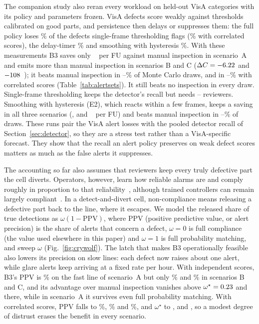 The companion study also reran every workload on \PaperAVisaCategories{} held-out VisA categories with its policy and parameters frozen. VisA defects score weakly against thresholds calibrated on good parts, and persistence then delays or suppresses them: the full policy loses \VisaRecallLossFull\% of the defects single-frame thresholding flags (\VisaCorrRecallLossFull\% with correlated scores), the delay-timer \VisaRecallLossTimer\% and smoothing with hysteresis \VisaRecallLossHyst\%. With these measurements B3 saves only \PrecVisaDeltaCvsLZero~\kgce{} per FU against manual inspection in scenario~A and emits more than manual inspection in scenarios B and C ($\Delta C=-6.22$ and $-108$~\kgce{}); it beats manual inspection in \VisaMcProbLMin--\VisaMcProbLMax\% of Monte Carlo draws, and in \VisaCorrMcProbLMin--\VisaCorrMcProbLMax\% with correlated scores (Table~\ref{tab:alertsets}). It still beats no inspection in every draw. Single-frame thresholding keeps the detector's recall but needs \VisaReviewersBZeroMin--\VisaReviewersBZeroMax{} reviewers. Smoothing with hysteresis (E2), which reacts within a few frames, keeps a saving in all three scenarios (\PrecVisaETwoDeltaC, \MetalVisaETwoDeltaC{} and \HiValVisaETwoDeltaC~\kgce{} per FU) and beats manual inspection in \VisaETwoMcProbMin--\VisaETwoMcProbMax\% of draws. These runs pair the VisA alert losses with the pooled detector recall of Section~\ref{sec:detector}, so they are a stress test rather than a VisA-specific forecast. They show that the recall an alert policy preserves on weak defect scores matters as much as the false alerts it suppresses.



The accounting so far also assumes that reviewers keep every truly defective part the cell diverts. Operators, however, learn how reliable alarms are and comply roughly in proportion to that reliability~\cite{bliss1995probability}, although trained controllers can remain largely compliant~\cite{wickens2009false}. In a detect-and-divert cell, non-compliance means releasing a defective part back to the line, where it escapes. We model the released share of true detections as $\omega(1-\mathrm{PPV})$, where PPV (positive predictive value, or alert precision) is the share of alerts that concern a defect, $\omega=0$ is full compliance (the value used elsewhere in this paper) and $\omega=1$ is full probability matching, and sweep $\omega$ (Fig.~\ref{fig:crywolf}). The latch that makes B3 operationally feasible also lowers its precision on slow lines: each defect now raises about one alert, while glare alerts keep arriving at a fixed rate per hour. With independent scores, B3's PPV is \PrecPpvBThree\% on the fast line of scenario~A but only \MetalPpvBThree\% and \HiValPpvBThree\% in scenarios B and C, and its advantage over manual inspection vanishes above $\omega^\star=0.23$ and \HiValOmegaStar{} there, while in scenario~A it survives even full probability matching. With correlated scores, PPV falls to \PrecCorrPpvBThree\%, \MetalCorrPpvBThree\% and \HiValCorrPpvBThree\%, and $\omega^\star$ to \PrecCorrOmegaStar, \MetalCorrOmegaStar{} and \HiValCorrOmegaStar, so a modest degree of distrust erases the benefit in every scenario.

